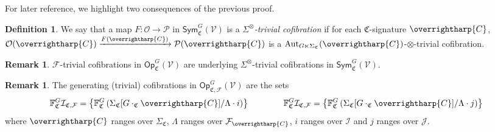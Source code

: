 \documentclass[a4paper,10pt
,draft
]{article}%
\numberwithin{equation}{section}
\numberwithin{figure}{section}
\theoremstyle{definition} %
\newtheorem{definition}[equation]{Definition}%
\newtheorem{remark}[equation]{Remark}%
\newcommand{\vect}[1]{\text{\overrightharp{\ensuremath{#1}}}}
\newcommand{\Sym}{\ensuremath{\mathsf{Sym}}}%
\newcommand{\Op}{\mathsf{Op}}%
\DeclareMathOperator{\Aut}{Aut}%
\newcommand{\F}{\ensuremath{\mathcal F}}
\newcommand{\V}{\ensuremath{\mathcal V}}
\renewcommand{\O}{\ensuremath{\mathcal O}}
\renewcommand{\P}{\ensuremath{\mathcal P}}
\newcommand{\1}{\ensuremath{\mathbbm 1}}%
\begin{document}
For later reference, 
we highlight two consequences of the previous proof.

\begin{definition}
      \label{SOTIMES_DEF}
      We say that a map $F \colon \O \to \P$ in $\Sym^G_{\mathfrak C}(\V)$ is a \textit{$\Sigma^{\otimes}$-trivial cofibration} if
      for each $\mathfrak C$-signature $\vect C$,
      $\O(\vect C) \xrightarrow{F(\vect C)} \P(\vect C)$
      is a $\Aut_{G \ltimes \Sigma_{\mathfrak C}}(\vect C)$-$\otimes$-trivial cofibration.
\end{definition}

\begin{remark}\label{GOTC_REM}
$\F$-trivial cofibrations in $\Op^G_{\mathfrak C}(\V)$ are underlying $\Sigma^{\otimes}$-trivial cofibrations
in $\mathsf{Sym}^G_{\mathfrak C}(\V)$.
\end{remark}

\begin{remark}
The generating (trivial) cofibrations in
$\mathsf{Op}^G_{\mathfrak{C},\F}(\V)$
are the sets
\begin{equation}\label{FVGSIGF EQ}
	\mathbb{F}^G_{\mathfrak{C}}\mathcal{I}_{\mathfrak{C},\mathcal{F}}
=
	\left\{
	\mathbb{F}^G_{\mathfrak{C}}
	\left(\Sigma_{\mathfrak{C}}[G \cdot_{\mathfrak{C}} \vect{C}]/\Lambda \cdot i \right)
	\right\}
\qquad \qquad
	\mathbb{F}^G_{\mathfrak{C}}\mathcal{I}_{\mathfrak{C},\mathcal{F}}
=
	\left\{
	\mathbb{F}^G_{\mathfrak{C}}
	\left(\Sigma_{\mathfrak{C}}[G \cdot_{\mathfrak{C}} \vect{C}]/\Lambda \cdot j \right)
	\right\}
\end{equation}
where $\vect{C}$ ranges over $\Sigma_{\mathfrak{C}}$,
$\Lambda$ ranges over $\F_{\vect{C}}$,
$i$ ranges over $\mathcal{I}$ and
$j$ ranges over $\mathcal{J}$.
\end{remark}
\end{document}
